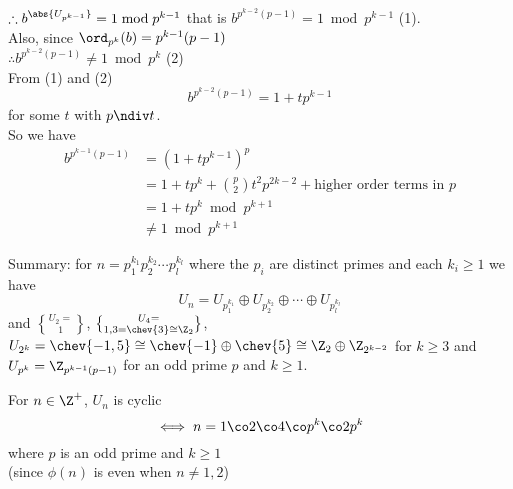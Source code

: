 \begin{enumerate}
$\therefore b^{\abs{U_{p^{k-1}}}}=1\bmod p^{k-1}$ that is $b^{p^{k-2}(p-1)}=1\bmod p^{k-1}$ (1). \\
Also, since $\ord_{p^k}(b)=p^{k-1}(p-1)$ \\
$\therefore b^{p^{k-2}(p-1)}\neq1\bmod p^k$ (2) \\
From (1) and (2)
\[ b^{p^{k-2}(p-1)} = 1 + tp^{k-1} \]
for some $t$ with $p\ndiv t$. \\
So we have
\begin{align*}
b^{p^{k-1}(p-1)} &= (1+tp^{k-1})^p \\
&= 1 + tp^k + \binom{p}{2}t^2p^{2k-2} + \text{higher order terms in $p$} \\
&= 1 + tp^k \bmod p^{k+1} \\
&\neq 1 \bmod p^{k+1}
\end{align*}
\end{enumerate}
Summary: for $n=p_1^{k_1}p_2^{k_2}\dotsm p_l^{k_l}$ where the $p_i$ are distinct primes and each $k_i\geq1$ we have
\[ U_n = U_{p_1^{k_1}} \oplus U_{p_2^{k_2}} \oplus \dotsb \oplus U_{p_l^{k_l}} \]
and $U_2=\brace1$, $U_4=\brace{1,3}=\chev{3}\cong\Z_2$, $U_{2^k}=\chev{-1,5}\cong\chev{-1}\oplus\chev{5}\cong\Z_2\oplus\Z_{2^{k-2}}$ for $k\geq3$ and $U_{p^k}=\Z_{p^{k-1}(p-1)}$ for an odd prime $p$ and $k\geq1$.

\cor For $n\in\Z^+$, $U_n$ is cyclic
\[ \iff n = 1\co2\co4\co p^k\co 2p^k \]
where $p$ is an odd prime and $k\geq1$ \\
(since $\phi(n)$ is even when $n\neq1,2$)
